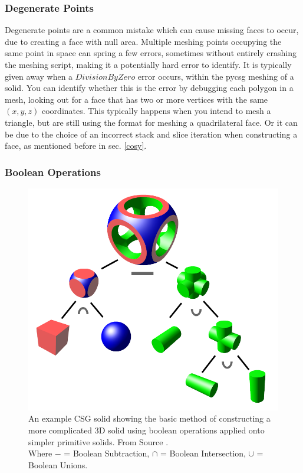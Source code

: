 \documentclass[12pt,a4paper]{article}
\begin{document}
\subsubsection{Degenerate Points}
Degenerate points are a common mistake which can cause missing faces to occur, due to creating a face with null area. Multiple meshing points occupying the same point in space can spring a few errors, sometimes without entirely crashing the meshing script, making it a potentially hard error to identify. It is typically given away when a $DivisionByZero$ error occurs, within the pycsg meshing of a solid. You can identify whether this is the error by debugging each polygon in a mesh, looking out for a face that has two or more vertices with the same $(x,y,z)$ coordinates. This typically happens when you intend to mesh a triangle, but are still using the format for meshing a quadrilateral face. Or it can be due to the choice of an incorrect stack and slice iteration when constructing a face, as mentioned before in sec. \ref{cosy}.

\newpage
\subsubsection{Boolean Operations}
\label{bool}

\begin{figure}[h!]
\centering
\includegraphics[scale=0.25]{Images//Booleans//Boolean.png}
\caption[width=\columnwidth]{An example CSG solid showing the basic method of constructing a more complicated 3D solid using boolean operations applied onto simpler primitive solids. From Source \cite{wiki}.\\
Where $-$ = Boolean Subtraction, $\cap$ = Boolean Intersection, $\cup$ = Boolean Unions.}
\label{booly}
\end{figure}
\end{document}
